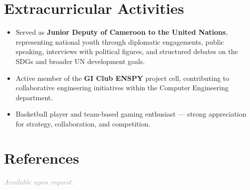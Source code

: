 \documentclass[10pt, a4paper]{article}
\begin{document}
\section{Extracurricular Activities}

\begin{itemize}
  \item Served as \textbf{Junior Deputy of Cameroon to the United Nations}, representing national
        youth through diplomatic engagements, public speaking, interviews with political figures,
        and structured debates on the SDGs and broader UN development goals.
  \item Active member of the \textbf{GI Club ENSPY} project cell, contributing to collaborative
        engineering initiatives within the Computer Engineering department.
  \item Basketball player and team-based gaming enthusiast — strong appreciation for
        strategy, collaboration, and competition.
\end{itemize}

\section{References}

\textit{\textcolor{darkgray}{Available upon request.}}
\end{document}
